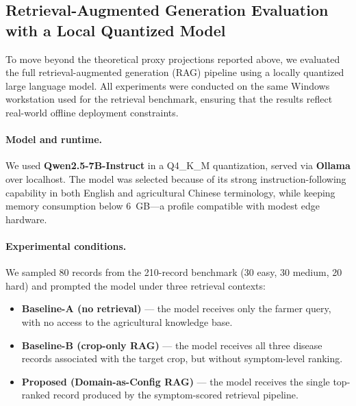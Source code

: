 
\subsection{Retrieval-Augmented Generation Evaluation with a Local Quantized Model}

To move beyond the theoretical proxy projections reported above, we evaluated the full retrieval-augmented generation (RAG) pipeline using a locally quantized large language model. All experiments were conducted on the same Windows workstation used for the retrieval benchmark, ensuring that the results reflect real-world offline deployment constraints.

\paragraph{Model and runtime.} We used \textbf{Qwen2.5-7B-Instruct} in a Q4\_K\_M quantization, served via \textbf{Ollama} over localhost. The model was selected because of its strong instruction-following capability in both English and agricultural Chinese terminology, while keeping memory consumption below 6~GB---a profile compatible with modest edge hardware.

\paragraph{Experimental conditions.} We sampled 80 records from the 210-record benchmark (30 easy, 30 medium, 20 hard) and prompted the model under three retrieval contexts:

\begin{itemize}[leftmargin=*]
    \item \textbf{Baseline-A (no retrieval)} --- the model receives only the farmer query, with no access to the agricultural knowledge base.
    \item \textbf{Baseline-B (crop-only RAG)} --- the model receives all three disease records associated with the target crop, but without symptom-level ranking.
    \item \textbf{Proposed (Domain-as-Config RAG)} --- the model receives the single top-ranked record produced by the symptom-scored retrieval pipeline.
\end{itemize}

